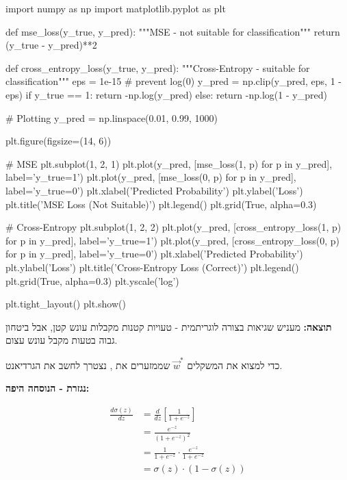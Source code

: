 \begin{pythonbox}
import numpy as np
import matplotlib.pyplot as plt

def mse_loss(y_true, y_pred):
    """MSE - not suitable for classification"""
    return (y_true - y_pred)**2

def cross_entropy_loss(y_true, y_pred):
    """Cross-Entropy - suitable for classification"""
    eps = 1e-15  # prevent log(0)
    y_pred = np.clip(y_pred, eps, 1 - eps)
    if y_true == 1:
        return -np.log(y_pred)
    else:
        return -np.log(1 - y_pred)

# Plotting
y_pred = np.linspace(0.01, 0.99, 1000)

plt.figure(figsize=(14, 6))

# MSE
plt.subplot(1, 2, 1)
plt.plot(y_pred, [mse_loss(1, p) for p in y_pred], label='y_true=1')
plt.plot(y_pred, [mse_loss(0, p) for p in y_pred], label='y_true=0')
plt.xlabel('Predicted Probability')
plt.ylabel('Loss')
plt.title('MSE Loss (Not Suitable)')
plt.legend()
plt.grid(True, alpha=0.3)

# Cross-Entropy
plt.subplot(1, 2, 2)
plt.plot(y_pred, [cross_entropy_loss(1, p) for p in y_pred], label='y_true=1')
plt.plot(y_pred, [cross_entropy_loss(0, p) for p in y_pred], label='y_true=0')
plt.xlabel('Predicted Probability')
plt.ylabel('Loss')
plt.title('Cross-Entropy Loss (Correct)')
plt.legend()
plt.grid(True, alpha=0.3)
plt.yscale('log')

plt.tight_layout()
plt.show()
\end{pythonbox}

\textbf{תוצאה:}  מעניש שגיאות בצורה לוגריתמית - טעויות קטנות מקבלות עונש קטן, אבל ביטחון גבוה בטעות מקבל עונש עצום.


כדי למצוא את המשקלים $\vec{w}^*$ שממזערים את , נצטרך לחשב את הגרדיאנט.

\textbf{נגזרת  - הנוסחה היפה:}

\begin{align}
\frac{d\sigma(z)}{dz} &= \frac{d}{dz}\left[\frac{1}{1+e^{-z}}\right] \nonumber \\
&= \frac{e^{-z}}{(1+e^{-z})^2} \nonumber \\
&= \frac{1}{1+e^{-z}} \cdot \frac{e^{-z}}{1+e^{-z}} \nonumber \\
&= \sigma(z) \cdot (1 - \sigma(z))
\end{align}

